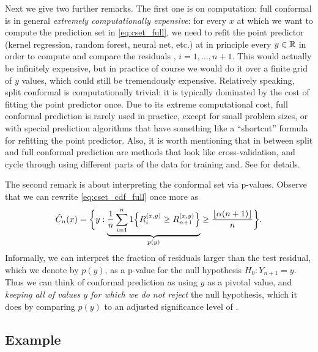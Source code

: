 \documentclass{article}
\begin{document}
Next we give two further remarks. The first one is on computation: full
conformal is in general \emph{extremely computationally expensive}: for every
$x$ at which we want to compute the prediction set  in
\eqref{eq:cset_full}, we need to refit the point predictor 
 (kernel regression, random forest, neural net, etc.) at 
in principle every $y \in \mathbb{R}$ in order to compute and compare the residuals
, $i=1,\dots,n+1$. This would actually be infinitely
expensive, but in practice of course we would do it over a finite grid of $y$
values, which could still be tremendously expensive. Relatively speaking, split 
conformal is computationally trivial: it is typically dominated by the cost of
fitting the point predictor  once. Due to its extreme
computational cost, full conformal prediction is rarely used in practice, except
for small problem sizes, or with special prediction algorithms that have
something like a ``shortcut'' formula for refitting the point predictor. 
Also, it is worth mentioning that in between split and full conformal prediction
are methods that look like cross-validation, and cycle through using different
parts of the data for training and. See \citet{barber2021predictive} for
details.   

The second remark is about interpreting the conformal set via p-values. Observe 
that we can rewrite \eqref{eq:cset_cdf_full} once more as
\[
\hat{C}_n(x) = \bigg\{ y : \underbrace{\frac{1}{n} \sum_{i=1}^n 1\Big\{ R_i^{(x,y)} 
  \geq R^{(x,y)}_{n+1} \Big\}}_{p(y)} \geq \frac{\lfloor \alpha (n+1) \rfloor}{n} 
\bigg\}.  
\]
Informally, we can interpret the fraction of residuals larger than the test
residual, which we denote by $p(y)$, as a p-value for the null hypothesis $H_0: 
Y_{n+1} = y$. Thus we can think of conformal prediction as using $y$ as a
pivotal value, and \emph{keeping all of values $y$ for which we do not reject}
the null hypothesis, which it does by comparing $p(y)$ to an adjusted
significance level of .

\subsection{Example}
\end{document}
